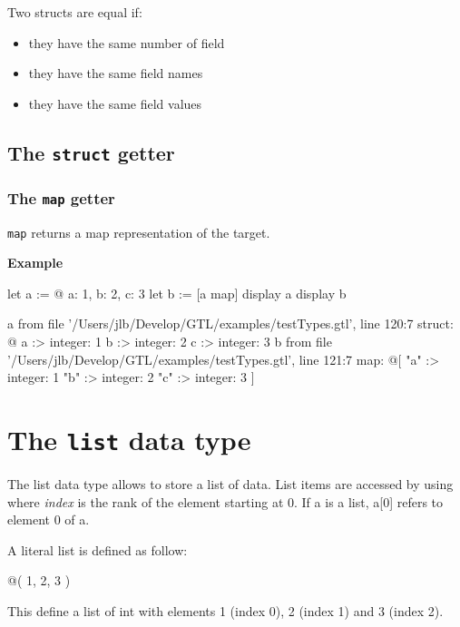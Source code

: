 \documentclass[10pt,openright,twosides,final]{memoir}
\newcommand{\var}[1]{{\small\ttfamily #1}}
\newcommand{\gtlinline}[1]{\colorbox{light-blue}{\lstinline[language=gtl]{#1}}}
\newcommand{\example}{\vspace{.75em}\noindent\textbf{Example}\vspace{0em}}
\begin{document}
Two structs are equal if:
\begin{itemize}[noitemsep]
\item they have the same number of field
\item they have the same field names
\item they have the same field values
\end{itemize}

\subsection{The \texttt{struct} getter}

\subsubsection{The \texttt{map} getter}
\label{sec:mapGetterOnStruct}

\gtlinline{map} returns a map representation of the target.

\example
\begin{gtl}
let a := @{ a: 1, b: 2, c: 3 }
let b := [a map]
display a
display b
\end{gtl}
\begin{console}
a from file '/Users/jlb/Develop/GTL/examples/testTypes.gtl', line 120:7
    struct: @{
        a :>
            integer: 1
        b :>
            integer: 2
        c :>
            integer: 3
    }
b from file '/Users/jlb/Develop/GTL/examples/testTypes.gtl', line 121:7
    map: @[
        "a" :>
            integer: 1
        "b" :>
            integer: 2
        "c" :>
            integer: 3
    ]
\end{console}

\section{The \texttt{list} data type}

The list data type allows to store a list of data. List items are accessed by using \var{[{\em index}]} where \var{\em index} is the rank of the element starting at 0. If \var{a} is a list, \var{a[0]} refers to element 0 of \var{a}.

A literal list is defined as follow:

\begin{gtl}
@( 1, 2, 3 )
\end{gtl}

This define a list of int with elements 1 (index 0), 2 (index 1) and 3 (index 2).
\end{document}
